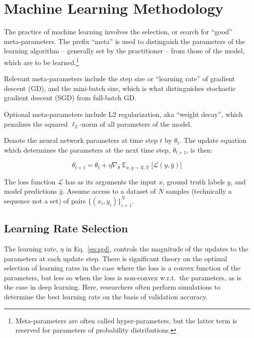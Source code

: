\documentclass[11pt]{article} %
\begin{document}
\section{Machine Learning Methodology}

The practice of machine learning involves the selection, or search for ``good'' 
meta-parameters. The prefix ``meta'' is used to distinguish the parameters of
the learning algorithm -- generally set by the practitioner -- from those of the
model, which are to be learned.\footnote{Meta-parameters are often called
hyper-parameters, but the latter term is reserved for parameters of 
probability distributions.}

Relevant meta-parameters include the step size or ``learning rate'' of gradient
descent (GD), and the mini-batch size, which is what distinguishes stochastic
gradient descent (SGD) from full-batch GD. 

Optional meta-parameters include L2 regularization, aka ``weight decay'',
which penalizes the squared $\ell_2$-norm of all parameters of the model.

Denote the neural network parameters at time step $t$ by $\theta_t$. The update
equation which determines the parameters at the next time step, $\theta_{t + 
1}$, is then:

\begin{equation} \label{eq:sgd}
\theta_{t + 1} = \theta_t + \eta \nabla_{\theta} \mathop{\mathbb{E}}_{x,y \sim 
X, Y} \big[ \mathcal{L}(y, \hat{y}) \big]
\end{equation}

The loss function $\mathcal{L}$ has as its arguments the input $x$, ground
truth labels $y$, and model predictions $\hat{y}$. Assume access to a dataset 
of $N$ samples (technically a sequence not a set) of pairs 
$\{ (x_i, y_i)\}_{i=1}^{N} $.

\subsection{Learning Rate Selection}

The learning rate, $\eta$ in Eq.~\eqref{eq:sgd}, controls the magnitude of the 
updates to the parameters at each update step. There is significant theory on
the optimal selection of learning rates in the case where the loss is a convex
function of the parameters, but less so when the loss is non-convex w.r.t.~the
parameters, as is the case in deep learning. Here, researchers often perform
simulations to determine the best learning rate on the basis of validation 
accuracy.
\end{document}
